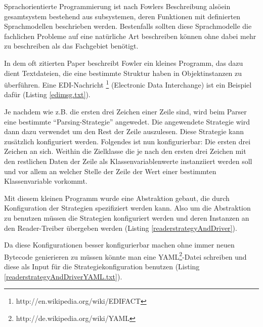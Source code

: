 \documentclass[11pt,english,ngerman, headsepline]{scrreprt}
\begin{document}
Sprachorientierte Programmierung ist nach Fowlers Beschreibung alsöein
gesamtsystem bestehend aus subsystemen, deren Funktionen mit definierten
Sprachmodellen beschrieben werden. Bestenfalls sollten diese Sprachmodelle
die fachlichen Probleme auf eine natürliche Art beschreiben können ohne dabei
mehr zu beschreiben als das Fachgebiet benötigt.

In dem oft zitierten Paper beschreibt Fowler ein kleines Programm, das dazu
dient Textdateien, die eine bestimmte Struktur haben in Objektinstanzen zu
überführen.
Eine EDI-Nachricht \footnote{http://en.wikipedia.org/wiki/EDIFACT} (Electronic
Data Interchange) ist ein Beispiel dafür (Listing \ref{edimsg.txt}).



Je nachdem wie z.B. die ersten drei Zeichen einer Zeile sind, wird beim
Parser eine bestimmte ``Parsing-Strategie'' angewedet. \cite{gamma1995design}
Die angewendete Strategie wird dann dazu verwendet um den Rest der Zeile
auszulesen. Diese Strategie kann zusätzlich konfiguriert werden. 
Folgendes ist nun konfigurierbar: Die ersten drei Zeichen an sich. Weithin die
Zielklasse die je nach den ersten drei Zeichen mit den restlichen Daten der
Zeile als Klassenvariablenwerte instanziiert werden soll und vor allem an
welcher Stelle der Zeile der Wert einer bestimmten Klassenvariable vorkommt.

Mit diesem kleinen Programm wurde eine Abstraktion gebaut, die durch
Konfiguration der Strategien spezifiziert werden kann.
Also um die Abstraktion zu benutzen müssen die Strategien konfiguriert werden
und deren Instanzen an den Reader-Treiber übergeben werden  (Listing
\ref{readerstrategyAndDriver}).
 



Da diese Konfigurationen besser konfigurierbar machen ohne immer neuen Bytecode
genierieren zu müssen könnte man eine
YAML\footnote{http://de.wikipedia.org/wiki/YAML}-Datei schreiben und diese als
Input für die Strategiekonfiguration benutzen  (Listing
\ref{readerstrategyAndDriverYAML.txt}).
 

\end{document}
